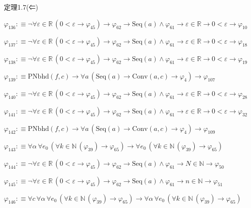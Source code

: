 \begin{fullproof}{定理1.7(⇐)}
\begin{abbrevlist}
\item $\varphi_{136} :\equiv \neg \forall \varepsilon \in \mathbb{R}\,(0 < \varepsilon \to \varphi_{45}) \to \varphi_{62} \to \mathrm{Seq}(a) \land \varphi_{61} \to \varepsilon \in \mathbb{R} \to 0 < \varepsilon \to \varphi_{10}$
\item $\varphi_{137} :\equiv \neg \forall \varepsilon \in \mathbb{R}\,(0 < \varepsilon \to \varphi_{45}) \to \varphi_{62} \to \mathrm{Seq}(a) \land \varphi_{61} \to \varepsilon \in \mathbb{R} \to 0 < \varepsilon \to \varphi_{18}$
\item $\varphi_{138} :\equiv \neg \forall \varepsilon \in \mathbb{R}\,(0 < \varepsilon \to \varphi_{45}) \to \varphi_{62} \to \mathrm{Seq}(a) \land \varphi_{61} \to \varepsilon \in \mathbb{R} \to 0 < \varepsilon \to \varphi_{19}$
\item $\varphi_{139} :\equiv \mathrm{PNbhd}(f,c) \to \forall a\,(\mathrm{Seq}(a) \to \mathrm{Conv}(a,c) \to \varphi_{4}) \to \varphi_{107}$
\item $\varphi_{140} :\equiv \neg \forall \varepsilon \in \mathbb{R}\,(0 < \varepsilon \to \varphi_{45}) \to \varphi_{62} \to \mathrm{Seq}(a) \land \varphi_{61} \to \varepsilon \in \mathbb{R} \to 0 < \varepsilon \to \varphi_{28}$
\item $\varphi_{141} :\equiv \neg \forall \varepsilon \in \mathbb{R}\,(0 < \varepsilon \to \varphi_{45}) \to \varphi_{62} \to \mathrm{Seq}(a) \land \varphi_{61} \to \varepsilon \in \mathbb{R} \to 0 < \varepsilon \to \varphi_{32}$
\item $\varphi_{142} :\equiv \mathrm{PNbhd}(f,c) \to \forall a\,(\mathrm{Seq}(a) \to \mathrm{Conv}(a,c) \to \varphi_{4}) \to \varphi_{109}$
\item $\varphi_{143} :\equiv \forall \alpha\,\forall e_{0}\,(\forall k \in \mathbb{N}\,(\varphi_{39}) \to \varphi_{65}) \to \forall e_{0}\,(\forall k \in \mathbb{N}\,(\varphi_{39}) \to \varphi_{65})$
\item $\varphi_{144} :\equiv \neg \forall \varepsilon \in \mathbb{R}\,(0 < \varepsilon \to \varphi_{45}) \to \varphi_{62} \to \mathrm{Seq}(a) \land \varphi_{61} \to N \in \mathbb{N} \to \varphi_{50}$
\item $\varphi_{145} :\equiv \neg \forall \varepsilon \in \mathbb{R}\,(0 < \varepsilon \to \varphi_{45}) \to \varphi_{62} \to \mathrm{Seq}(a) \land \varphi_{61} \to n \in \mathbb{N} \to \varphi_{51}$
\item $\varphi_{146} :\equiv \forall c\,\forall \alpha\,\forall e_{0}\,(\forall k \in \mathbb{N}\,(\varphi_{39}) \to \varphi_{65}) \to \forall \alpha\,\forall e_{0}\,(\forall k \in \mathbb{N}\,(\varphi_{39}) \to \varphi_{65})$

\end{abbrevlist}
\end{fullproof}
